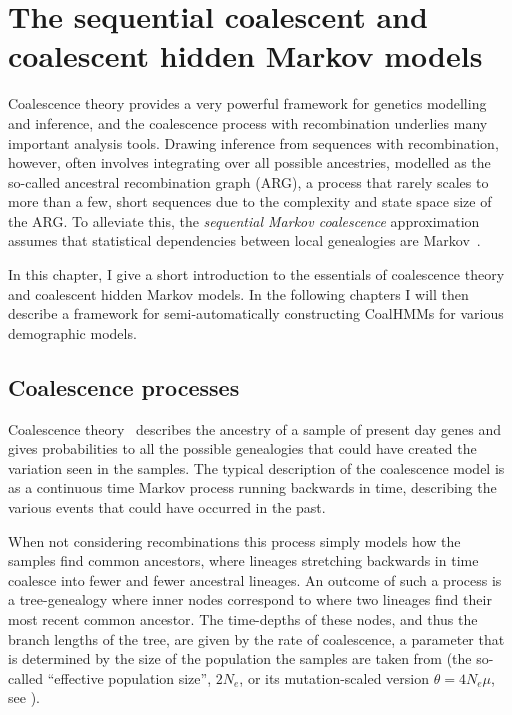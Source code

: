 \chapter{The sequential coalescent and coalescent hidden Markov models}
\label{chap:smc-coalhmm}

Coalescence theory provides a very powerful framework for genetics modelling and inference, and the coalescence process with recombination underlies many important analysis tools. Drawing inference from sequences with recombination, however, often involves integrating over all possible ancestries, modelled as the so-called ancestral recombination graph (ARG), a process that rarely scales to more than a few, short sequences due to the complexity and state space size of the ARG. To alleviate this, the \emph{sequential Markov coalescence} approximation assumes that statistical dependencies between local genealogies are Markov~\cite{McVean:2005ho, Marjoram:2006hp,Hobolth:2014cw}.

In this chapter, I give a short introduction to the essentials of coalescence theory and coalescent hidden Markov models. In the following chapters I will then describe a framework for semi-automatically constructing CoalHMMs for various demographic models.

\section{Coalescence processes}

Coalescence theory~\cite{Hein:2005vz} describes the ancestry of a sample of present day genes and gives probabilities to all the possible genealogies that could have created the variation seen in the samples. The typical description of the coalescence model is as a continuous time Markov process running backwards in time, describing the various events that could have occurred in the past.

When not considering recombinations this process simply models how the samples find common ancestors, where lineages stretching backwards in time coalesce into fewer and fewer ancestral lineages.  An outcome of such a process is a tree-genealogy where inner nodes correspond to where two lineages find their most recent common ancestor. The time-depths of these nodes, and thus the branch lengths of the tree, are given by the rate of coalescence, a parameter that is determined by the size of the population the samples are taken from (the so-called ``effective population size'', $2N_e$, or its mutation-scaled version $\theta=4 N_e \mu$, see \citet{Hein:2005vz}).

